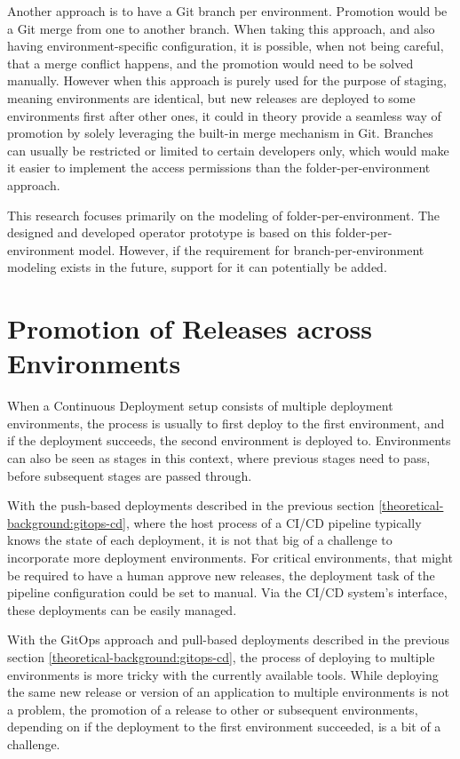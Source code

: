 Another approach is to have a Git branch per environment.
Promotion would be a Git merge from one to another branch.
When taking this approach, and also having environment-specific configuration,
it is possible, when not being careful, that a merge conflict happens,
and the promotion would need to be solved manually.
However when this approach is purely used for the purpose of staging,
meaning environments are identical, but new releases are deployed to some environments first
after other ones,
it could in theory provide a seamless way of promotion by solely leveraging the built-in merge mechanism in Git.
Branches can usually be restricted or limited to certain developers only,
which would make it easier to implement the access permissions than the folder-per-environment approach.

This research focuses primarily on the modeling of folder-per-environment.
The designed and developed operator prototype is based on this folder-per-environment model.
However, if the requirement for branch-per-environment modeling exists in the future,
support for it can potentially be added.








\section{Promotion of Releases across Environments}

When a Continuous Deployment setup consists of multiple deployment environments,
the process is usually to first deploy to the first environment,
and if the deployment succeeds, the second environment is deployed to.
Environments can also be seen as stages in this context,
where previous stages need to pass, before subsequent stages are passed through.

With the push-based deployments described in the previous section \ref{theoretical-background:gitops-cd},
where the host process of a CI/CD pipeline typically knows the state of each deployment,
it is not that big of a challenge to incorporate more deployment environments.
For critical environments, that might be required to have a human approve new releases,
the deployment task of the pipeline configuration could be set to manual.
Via the CI/CD system's interface, these deployments can be easily managed.

With the GitOps approach and pull-based deployments described in the previous section \ref{theoretical-background:gitops-cd},
the process of deploying to multiple environments is more tricky with the currently available tools.
While deploying the same new release or version of an application to multiple environments is not a problem,
the promotion of a release to other or subsequent environments, depending on if the deployment to the first environment succeeded,
is a bit of a challenge.

